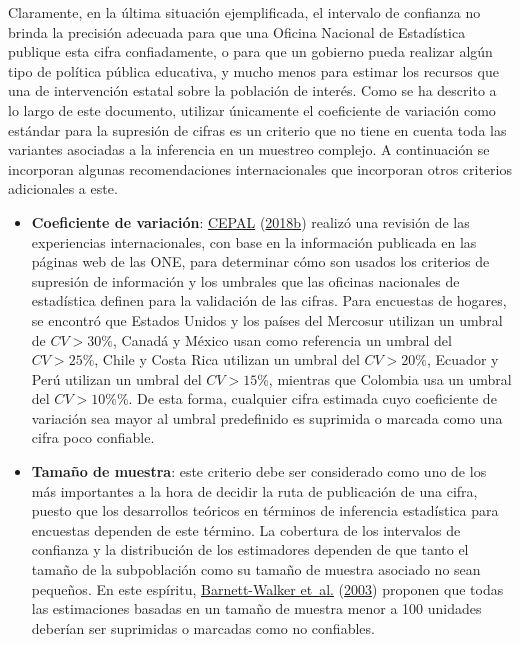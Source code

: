 \documentclass[
  12pt,
  spanish,
]{book}
\providecommand{\tightlist}{%
  \setlength{\itemsep}{0pt}\setlength{\parskip}{0pt}}
\begin{document}
Claramente, en la última situación ejemplificada, el intervalo de confianza no brinda la precisión adecuada para que una Oficina Nacional de Estadística publique esta cifra confiadamente, o para que un gobierno pueda realizar algún tipo de política pública educativa, y mucho menos para estimar los recursos que una de intervención estatal sobre la población de interés. Como se ha descrito a lo largo de este documento, utilizar únicamente el coeficiente de variación como estándar para la supresión de cifras es un criterio que no tiene en cuenta toda las variantes asociadas a la inferencia en un muestreo complejo. A continuación se incorporan algunas recomendaciones internacionales que incorporan otros criterios adicionales a este.

\begin{itemize}
\tightlist
\item
  \textbf{Coeficiente de variación}: \protect\hyperlink{ref-CepalSAe2018}{CEPAL} (\protect\hyperlink{ref-CepalSAe2018}{2018b}) realizó una revisión de las experiencias internacionales, con base en la información publicada en las páginas web de las ONE, para determinar cómo son usados los criterios de supresión de información y los umbrales que las oficinas nacionales de estadística definen para la validación de las cifras. Para encuestas de hogares, se encontró que Estados Unidos y los países del Mercosur utilizan un umbral de \(CV > 30\%\), Canadá y México usan como referencia un umbral del \(CV > 25\%\), Chile y Costa Rica utilizan un umbral del \(CV > 20\%\), Ecuador y Perú utilizan un umbral del \(CV > 15\%\), mientras que Colombia usa un umbral del \(CV > 10\%\)\%. De esta forma, cualquier cifra estimada cuyo coeficiente de variación sea mayor al umbral predefinido es suprimida o marcada como una cifra poco confiable.
\item
  \textbf{Tamaño de muestra}: este criterio debe ser considerado como uno de los más importantes a la hora de decidir la ruta de publicación de una cifra, puesto que los desarrollos teóricos en términos de inferencia estadística para encuestas dependen de este término. La cobertura de los intervalos de confianza y la distribución de los estimadores dependen de que tanto el tamaño de la subpoblación como su tamaño de muestra asociado no sean pequeños. En este espíritu, \protect\hyperlink{ref-Barnett_Walker_Chromy_Davis_Emrich_Odom_Packer_2003}{Barnett-Walker et~al.} (\protect\hyperlink{ref-Barnett_Walker_Chromy_Davis_Emrich_Odom_Packer_2003}{2003}) proponen que todas las estimaciones basadas en un tamaño de muestra menor a 100 unidades deberían ser suprimidas o marcadas como no confiables.

\end{itemize}
\end{document}
